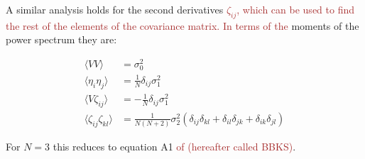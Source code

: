 \documentclass[12pt]{article}
\newcommand{\SH}[1]{\textcolor{brown}{[{\bf SH}: #1]}}
\newcommand{\sh}[1]{\textcolor{brown}{#1}}
\begin{document}
A similar analysis holds for the second derivatives \sh{$\zeta_{ij}$}\sh{, which can be used to find the rest of the elements of the covariance matrix. In terms of the} moments of the power spectrum they are:


\begin{equation} \label{corr}
\begin{split}
\langle VV \rangle &= \sigma_0^2 \\
\langle\eta_i\eta_j\rangle &= \frac{1}{N}\delta_{ij}\sigma_1^2 \\
\langle V\zeta_{ij}\rangle &= -\frac{1}{N}\delta_{ij}\sigma_1^2 \\
\langle\zeta_{ij}\zeta_{kl}\rangle &= \frac{1}{N(N+2)}\sigma_2^2(\delta_{ij}\delta_{kl}+\delta_{il}\delta_{jk}+\delta_{ik}\delta_{jl})
\end{split}
\end{equation}

\noindent For $N=3$ this reduces to equation A1 \sh{of \cite{BBKS} (hereafter called BBKS)}. 



\end{document}
